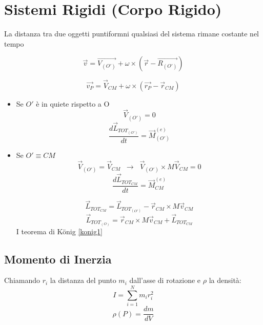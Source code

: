 \section{Sistemi Rigidi (Corpo Rigido)}
La distanza tra due oggetti puntiformni qualsiasi del sistema rimane costante nel tempo

\begin{equation*}
    \vec{v} = \vec{V_{(O')}} + \omega \times (\vec{r} - \vec{R_{(O')}})
\end{equation*}

\begin{equation}
    \vec{v_P} = \vec{V}_{CM} + \omega \times (\vec{r_P} - \vec{r}_ {CM})
\end{equation}

\begin{itemize}
    \item   Se $O'$ è in quiete rispetto a O
            \begin{equation*}
                \vec{V}_{(O')} = 0
            \end{equation*}
            \begin{equation}
                \frac{d\vec{L}_{TOT_{(O')}}}{dt} = \vec{M}_{(O')}^{(e)}
            \end{equation}
    \item   Se $O' \equiv CM$  
            \begin{equation*}
                \vec{V}_{(O')} = \vec{V}_{CM} \;\; \to \;\; \vec{V}_{(O')} \times M \vec{V}_{CM} = 0
            \end{equation*}
            \begin{equation*}
                \frac{d\vec{L}_{TOT_{CM}}}{dt} = \vec{M}_{CM}^{(e)}
            \end{equation*}
            
            \begin{equation*}
                \vec{L}_{TOT_{CM}} = \vec{L}_{TOT_{(O')}} - \vec{r}_{CM} \times M \vec{v}_{CM}
            \end{equation*}
            \begin{equation}
                \vec{L}_{TOT_{(O)}} = \vec{r}_{CM} \times M \vec{v}_{CM} + \vec{L}_{TOT_{CM}}
            \end{equation}
            I teorema di König \eqref{konig1}
\end{itemize}

\subsection{Momento di Inerzia}
Chiamando $r_i$ la distanza del punto $m_i$ dall'asse di rotazione e $\rho$ la densità:
\begin{equation}
    I = \sum_{i=1}^{N} m_i r_i^2
    \label{inerzia}
\end{equation}
\begin{equation}
    \rho(P) = \frac{dm}{dV}
    \label{densita}
\end{equation}

